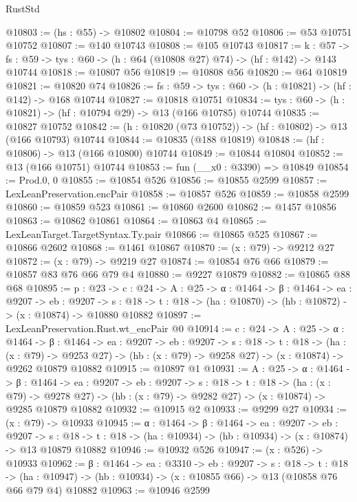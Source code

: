 \begin{lexlean}{RustStd}
\begin{coremodule}
@10803 := (hs : @55) -> @10802
@10804 := @10798 @52
@10806 := @53 @10751 @10752
@10807 := @140 @10743
@10808 := @105 @10743
@10817 := {k : @57} ->
  {fs : @59} -> {tys : @60} -> (h : @64 (@10808 @27) @74) -> (hf : @142) -> @143 @10744
@10818 := @10807 @56
@10819 := @10808 @56
@10820 := @64 @10819
@10821 := @10820 @74
@10826 := {fs : @59} -> {tys : @60} -> (h : @10821) -> (hf : @142) -> @168 @10744
@10827 := @10818 @10751
@10834 := {tys : @60} -> (h : @10821) -> (hf : @10794 @29) -> @13 (@166 @10785) @10744
@10835 := @10827 @10752
@10842 := (h : @10820 (@73 @10752)) -> (hf : @10802) -> @13 (@166 @10793) @10744
@10844 := @10835 (@188 @10819)
@10848 := (hf : @10806) -> @13 (@166 @10800) @10744
@10849 := @10844 @10804
@10852 := @13 (@166 @10751) @10744
@10853 := fun (__x0 : @3390) => @10849
@10854 := Prod.{0, 0}
@10855 := @10854 @526
@10856 := @10855 @2599
@10857 := LexLeanPreservation.encPair
@10858 := @10857 @526
@10859 := @10858 @2599
@10860 := @10859 @523
@10861 := @10860 @2600
@10862 := @1457 @10856
@10863 := @10862 @10861
@10864 := @10863 @4
@10865 := LexLeanTarget.TargetSyntax.Ty.pair
@10866 := @10865 @525
@10867 := @10866 @2602
@10868 := @1461 @10867
@10870 := (x : @79) -> @9212 @27
@10872 := (x : @79) -> @9219 @27
@10874 := @10854 @76 @66
@10879 := @10857 @83 @76 @66 @79 @4
@10880 := @9227 @10879
@10882 := @10865 @88 @68
@10895 := {p : @23} ->
  {c : @24} ->
  {A : @25} ->
  {α : @1464} ->
  {β : @1464} ->
  {ea : @9207} ->
  {eb : @9207} ->
  {s : @18} -> {t : @18} -> (ha : @10870) -> (hb : @10872) -> (x : @10874) -> @10880 @10882
@10897 := LexLeanPreservation.Rust.wt_encPair @0
@10914 := {c : @24} ->
  {A : @25} ->
  {α : @1464} ->
  {β : @1464} ->
  {ea : @9207} ->
  {eb : @9207} ->
  {s : @18} ->
  {t : @18} ->
  (ha : (x : @79) -> @9253 @27) ->
  (hb : (x : @79) -> @9258 @27) -> (x : @10874) -> @9262 @10879 @10882
@10915 := @10897 @1
@10931 := {A : @25} ->
  {α : @1464} ->
  {β : @1464} ->
  {ea : @9207} ->
  {eb : @9207} ->
  {s : @18} ->
  {t : @18} ->
  (ha : (x : @79) -> @9278 @27) ->
  (hb : (x : @79) -> @9282 @27) -> (x : @10874) -> @9285 @10879 @10882
@10932 := @10915 @2
@10933 := @9299 @27
@10934 := (x : @79) -> @10933
@10945 := {α : @1464} ->
  {β : @1464} ->
  {ea : @9207} ->
  {eb : @9207} ->
  {s : @18} -> {t : @18} -> (ha : @10934) -> (hb : @10934) -> (x : @10874) -> @13 @10879 @10882
@10946 := @10932 @526
@10947 := (x : @526) -> @10933
@10962 := {β : @1464} ->
  {ea : @3310} ->
  {eb : @9207} ->
  {s : @18} ->
  {t : @18} ->
  (ha : @10947) -> (hb : @10934) -> (x : @10855 @66) -> @13 (@10858 @76 @66 @79 @4) @10882
@10963 := @10946 @2599

\end{coremodule}
\end{lexlean}
